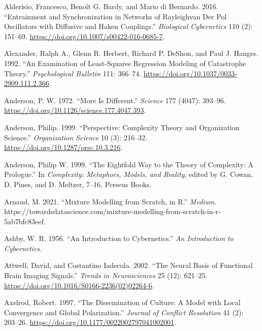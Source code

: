 \documentclass[
  a4paper,
  DIV=11,
  numbers=noendperiod]{scrreprt}
\newlength{\cslhangindent}
\newlength{\cslentryspacingunit} %
\newenvironment{CSLReferences}[2] %
 {%
  \setlength{\parindent}{0pt}
  \ifodd #1
  \let\oldpar\par
  \def\par{\hangindent=\cslhangindent\oldpar}
  \fi
  \setlength{\parskip}{#2\cslentryspacingunit}
 }%
 {}
\begin{document}
\begin{CSLReferences}{1}{0}
\leavevmode{}%
Alderisio, Francesco, Benoît G. Bardy, and Mario di Bernardo. 2016.
{``Entrainment and Synchronization in Networks of
{Rayleigh}\textendash van Der {Pol} Oscillators with Diffusive and
{Haken} Couplings.''}
\emph{Biological Cybernetics} 110 (2): 151--69.
\url{https://doi.org/10.1007/s00422-016-0685-7}.

\leavevmode{}%
Alexander, Ralph A., Glenn R. Herbert, Richard P. DeShon, and Paul J.
Hanges. 1992. {``An Examination of Least-Squares Regression Modeling of
Catastrophe Theory.''} \emph{Psychological Bulletin} 111: 366--74.
\url{https://doi.org/10.1037/0033-2909.111.2.366}.

\leavevmode{}%
Anderson, P. W. 1972. {``More {Is Different}.''} \emph{Science} 177
(4047): 393--96. \url{https://doi.org/10.1126/science.177.4047.393}.

\leavevmode{}%
Anderson, Philip. 1999. {``Perspective: {Complexity Theory} and
{Organization Science}.''} \emph{Organization Science} 10 (3): 216--32.
\url{https://doi.org/10.1287/orsc.10.3.216}.

\leavevmode{}%
Anderson, Philip W. 1999. {``The {Eightfold Way} to the {Theory} of
{Complexity}: {A Prologue}.''} In \emph{Complexity: Metaphors, Models,
and Reality}, edited by G. Cowan, D. Pines, and D. Meltzer, 7--16.
{Perseus Books}.

\leavevmode{}%
Arnaud, M. 2021. {``Mixture Modelling from Scratch, in {R}.''}
\emph{Medium}.
https://towardsdatascience.com/mixture-modelling-from-scratch-in-r-5ab7bfc83eef.

\leavevmode{}%
Ashby, W. R. 1956. {``An Introduction to Cybernetics.''} \emph{An
Introduction to Cybernetics.}

\leavevmode{}%
Attwell, David, and Costantino Iadecola. 2002. {``The Neural Basis of
Functional Brain Imaging Signals.''} \emph{Trends in Neurosciences} 25
(12): 621--25. \url{https://doi.org/10.1016/S0166-2236(02)02264-6}.

\leavevmode{}%
Axelrod, Robert. 1997. {``The {Dissemination} of {Culture}: {A Model}
with {Local Convergence} and {Global Polarization}.''} \emph{Journal of
Conflict Resolution} 41 (2): 203--26.
\url{https://doi.org/10.1177/0022002797041002001}.


\end{CSLReferences}
\end{document}
